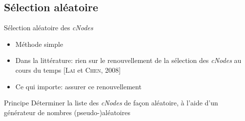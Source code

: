 \documentclass[aspectratio=43]{beamer} %
\newcommand\cns{\textit{cNodes}\xspace}
\begin{document}
\subsection{Sélection aléatoire}
\begin{frame}{Sélection aléatoire des \cns}
  \begin{itemize}
    \item Méthode simple
    \item Dans la littérature: rien sur le renouvellement de la sélection des \cns au cours du temps [\textsc{Lai} et \textsc{Chen}, 2008]
    \item Ce qui importe: assurer ce renouvellement
  \end{itemize}
  \begin{block}{Principe}
    Déterminer la liste des \cns de façon aléatoire, à l'aide d'un générateur de nombres (pseudo-)aléatoires
  \end{block}
\end{frame}
\end{document}
